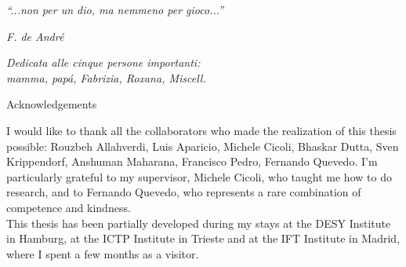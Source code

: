 \documentclass[12pt,a4paper]{book}
\begin{document}
\begin{midpage}
\begin{large}
\begin{center}
\textit{``...non per un dio, ma nemmeno per gioco...''}
\end{center}
\end{large}
\begin{flushright}
\textit{F. de Andr\'e}
\end{flushright}
\vspace{5cm}
\begin{large}
\begin{flushright}
\textit{Dedicata alle cinque persone importanti:\\
mamma, pap\'a, Fabrizia, Roxana, Miscell.}
\end{flushright}
\end{large}
\end{midpage}

\cleardoublepage

\begin{midpage}
\begin{center}
\huge{Acknowledgements}
\end{center}
\vspace{1cm}
I would like to thank all the collaborators who made the realization of this thesis possible: Rouzbeh Allahverdi, Luis Aparicio, Michele Cicoli, Bhaskar Dutta, Sven Krippendorf, Anshuman Maharana, Francisco Pedro, Fernando Quevedo. I'm particularly grateful to my supervisor, Michele Cicoli, who taught me how to do research, and to Fernando Quevedo, who represents a rare combination of competence and kindness.\\

This thesis has been partially developed during my stays at the DESY Institute in Hamburg, at the ICTP Institute in Trieste and at the IFT Institute in Madrid, where I spent a few months as a visitor.\\
\end{midpage}


\newpage
\end{document}
